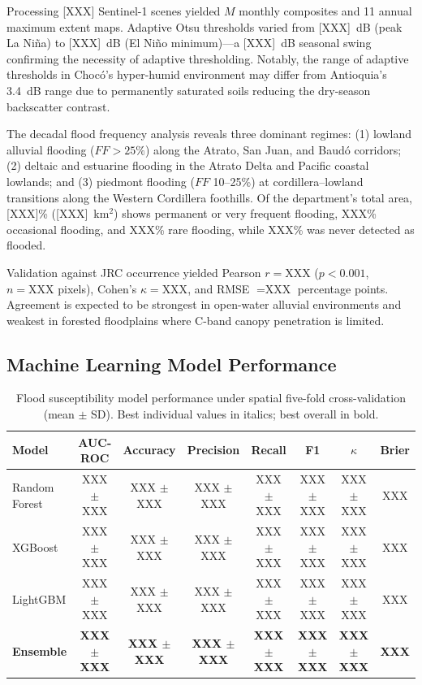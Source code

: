 \documentclass{article}
\begin{document}
Processing [XXX] Sentinel-1 scenes yielded $M$ monthly composites and 11 annual maximum extent maps. Adaptive Otsu thresholds varied from [XXX]~dB (peak La Ni\~na) to [XXX]~dB (El Ni\~no minimum)---a [XXX]~dB seasonal swing confirming the necessity of adaptive thresholding. Notably, the range of adaptive thresholds in Choc\'o's hyper-humid environment may differ from Antioquia's \SI{3.4}{\deci\bel} range due to permanently saturated soils reducing the dry-season backscatter contrast.

The decadal flood frequency analysis reveals three dominant regimes: (1) lowland alluvial flooding ($FF > 25\%$) along the Atrato, San Juan, and Baud\'o corridors; (2) deltaic and estuarine flooding in the Atrato Delta and Pacific coastal lowlands; and (3) piedmont flooding ($FF$ 10--25\%) at cordillera--lowland transitions along the Western Cordillera foothills. Of the department's total area, [XXX]\% ([XXX]~km$^2$) shows permanent or very frequent flooding, XXX\% occasional flooding, and XXX\% rare flooding, while XXX\% was never detected as flooded.

Validation against JRC occurrence yielded Pearson $r = \text{XXX}$ ($p < 0.001$, $n = \text{XXX}$ pixels), Cohen's $\kappa = \text{XXX}$, and RMSE $= \text{XXX}$ percentage points. Agreement is expected to be strongest in open-water alluvial environments and weakest in forested floodplains where C-band canopy penetration is limited.

\subsection{Machine Learning Model Performance}

\begin{table}[htbp]
\caption{Flood susceptibility model performance under spatial five-fold cross-validation (mean $\pm$ SD). Best individual values in italics; best overall in bold.}
\label{tab:ml_results}
\centering
\footnotesize
\begin{tabular}{lccccccc}
\toprule
\textbf{Model} & \textbf{AUC-ROC} & \textbf{Accuracy} & \textbf{Precision} & \textbf{Recall} & \textbf{F1} & \textbf{$\kappa$} & \textbf{Brier} \\
\midrule
Random Forest   & XXX $\pm$ XXX & XXX $\pm$ XXX & XXX $\pm$ XXX & XXX $\pm$ XXX & XXX $\pm$ XXX & XXX $\pm$ XXX & XXX \\
XGBoost         & XXX $\pm$ XXX & XXX $\pm$ XXX & XXX $\pm$ XXX & XXX $\pm$ XXX & XXX $\pm$ XXX & XXX $\pm$ XXX & XXX \\
LightGBM        & XXX $\pm$ XXX & XXX $\pm$ XXX & XXX $\pm$ XXX & XXX $\pm$ XXX & XXX $\pm$ XXX & XXX $\pm$ XXX & XXX \\
\textbf{Ensemble} & \textbf{XXX $\pm$ XXX} & \textbf{XXX $\pm$ XXX} & \textbf{XXX $\pm$ XXX} & \textbf{XXX $\pm$ XXX} & \textbf{XXX $\pm$ XXX} & \textbf{XXX $\pm$ XXX} & \textbf{XXX} \\
\bottomrule
\end{tabular}
\end{table}
\end{document}
